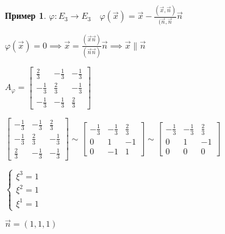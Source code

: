 \documentclass{book}
\theoremstyle{definition}
\newtheorem*{example}{Пример}
\begin{document}
\begin{example}
    $\varphi:E_3\to E_3\quad \varphi(\vec x) = \vec x - \frac{\left( \vec x, \vec n \right) }{(\vec n, \vec n}\vec n $

    $\varphi(\vec x) = 0 \implies \vec x = \frac{\left( \vec x\vec n \right) }{\left( \vec n\vec n \right) }\vec n \implies \vec x\parallel \vec n$ 

    $A_{\varphi} = \begin{bmatrix} \frac{2}{3}&-\frac{1}{3}&-\frac{1}{3}\\-\frac{1}{3} &\frac{2}{3}&-\frac{1}{3}\\-\frac{1}{3}&-\frac{1}{3}&\frac{2}{3} \end{bmatrix} $ 

    $\begin{bmatrix} -\frac{1}{3}&-\frac{1}{3}&\frac{2}{3}\\-\frac{1}{3}&\frac{2}{3}&-\frac{1}{3}\\\frac{2}{3} &-\frac{1}{3}&-\frac{1}{3} \end{bmatrix}
     \sim 
     \begin{bmatrix} -\frac{1}{3}&-\frac{1}{3}&\frac{2}{3}\\0&1&-1\\0&-1&1 \end{bmatrix} 
     \sim  
     \begin{bmatrix} -\frac{1}{3}&-\frac{1}{3}&\frac{2}{3}\\0&1&-1\\0&0&0 \end{bmatrix}  $ 

    $\begin{cases}
        \xi^3 = 1\\
        \xi^2 = 1\\
        \xi^1 = 1
    \end{cases}$ 

    $\vec n = \left( 1, 1, 1 \right) $
\end{example}
\end{document}
